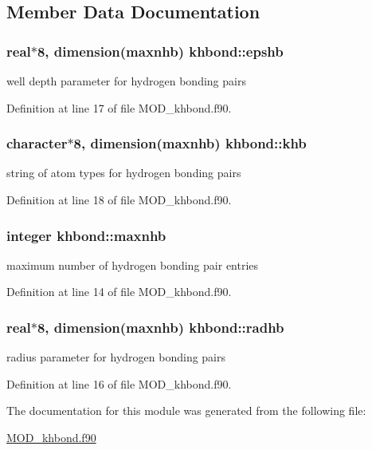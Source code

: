 \subsection{Member Data Documentation}
\hypertarget{classkhbond_a8661d177bc836a31a9864dbb965881f0}{
\subsubsection[{epshb}]{\setlength{\rightskip}{0pt plus 5cm}real$\ast$8, dimension({\bf maxnhb}) khbond\-::epshb}}\label{classkhbond_a8661d177bc836a31a9864dbb965881f0}


well depth parameter for hydrogen bonding pairs 



Definition at line 17 of file M\-O\-D\-\_\-khbond.\-f90.

\hypertarget{classkhbond_aa1d21ba43bdcd5ecfefd1898c3767af7}{
\subsubsection[{khb}]{\setlength{\rightskip}{0pt plus 5cm}character$\ast$8, dimension({\bf maxnhb}) khbond\-::khb}}\label{classkhbond_aa1d21ba43bdcd5ecfefd1898c3767af7}


string of atom types for hydrogen bonding pairs 



Definition at line 18 of file M\-O\-D\-\_\-khbond.\-f90.

\hypertarget{classkhbond_a1cf7918050308a08750c9a028c481185}{
\subsubsection[{maxnhb}]{\setlength{\rightskip}{0pt plus 5cm}integer khbond\-::maxnhb}}\label{classkhbond_a1cf7918050308a08750c9a028c481185}


maximum number of hydrogen bonding pair entries 



Definition at line 14 of file M\-O\-D\-\_\-khbond.\-f90.

\hypertarget{classkhbond_a21c2374dfa5b426583f62e2970deb95b}{
\subsubsection[{radhb}]{\setlength{\rightskip}{0pt plus 5cm}real$\ast$8, dimension({\bf maxnhb}) khbond\-::radhb}}\label{classkhbond_a21c2374dfa5b426583f62e2970deb95b}


radius parameter for hydrogen bonding pairs 



Definition at line 16 of file M\-O\-D\-\_\-khbond.\-f90.



The documentation for this module was generated from the following file\-:\begin{DoxyCompactItemize}
\item 
\hyperlink{MOD__khbond_8f90}{M\-O\-D\-\_\-khbond.\-f90}\end{DoxyCompactItemize}
